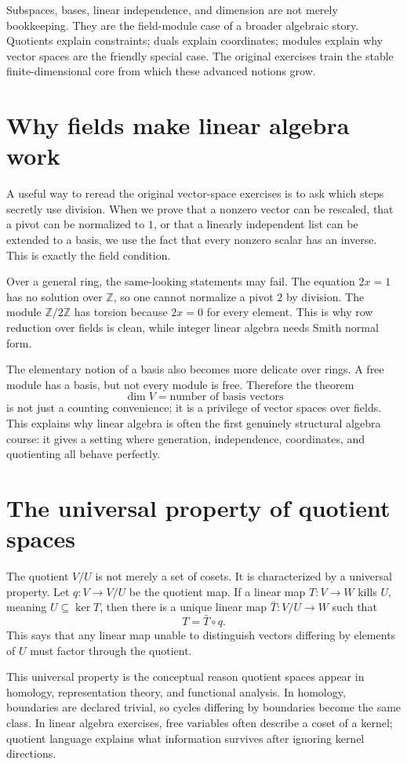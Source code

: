 Subspaces, bases, linear independence, and dimension are not merely bookkeeping.  They are the field-module case of a broader algebraic story.  Quotients explain constraints; duals explain coordinates; modules explain why vector spaces are the friendly special case.  The original exercises train the stable finite-dimensional core from which these advanced notions grow.

\section{Why fields make linear algebra work}

A useful way to reread the original vector-space exercises is to ask which steps secretly use division.  When we prove that a nonzero vector can be rescaled, that a pivot can be normalized to $1$, or that a linearly independent list can be extended to a basis, we use the fact that every nonzero scalar has an inverse.  This is exactly the field condition.

Over a general ring, the same-looking statements may fail.  The equation $2x=1$ has no solution over $\mathbb Z$, so one cannot normalize a pivot $2$ by division.  The module $\mathbb Z/2\mathbb Z$ has torsion because $2x=0$ for every element.  This is why row reduction over fields is clean, while integer linear algebra needs Smith normal form.

The elementary notion of a basis also becomes more delicate over rings.  A free module has a basis, but not every module is free.  Therefore the theorem
\[
  \dim V=\text{number of basis vectors}
\]
is not just a counting convenience; it is a privilege of vector spaces over fields.  This explains why linear algebra is often the first genuinely structural algebra course: it gives a setting where generation, independence, coordinates, and quotienting all behave perfectly.

\section{The universal property of quotient spaces}

The quotient $V/U$ is not merely a set of cosets.  It is characterized by a universal property.  Let $q:V\to V/U$ be the quotient map.  If a linear map $T:V\to W$ kills $U$, meaning $U\subseteq\ker T$, then there is a unique linear map $\bar T:V/U\to W$ such that
\[
  T=\bar T\circ q.
\]
This says that any linear map unable to distinguish vectors differing by elements of $U$ must factor through the quotient.

This universal property is the conceptual reason quotient spaces appear in homology, representation theory, and functional analysis.  In homology, boundaries are declared trivial, so cycles differing by boundaries become the same class.  In linear algebra exercises, free variables often describe a coset of a kernel; quotient language explains what information survives after ignoring kernel directions.
